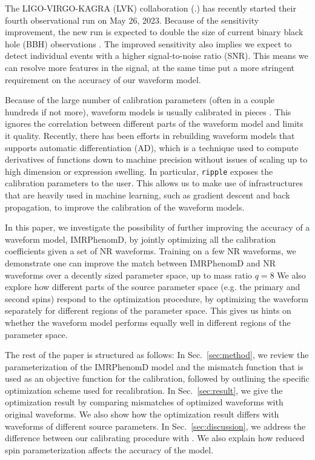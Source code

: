 \documentclass[twocolumn]{aastex631}
\newcommand{\ripple}{\texttt{ripple}}
\begin{document}

The LIGO-VIRGO-KAGRA (LVK) collaboration
(\citep{LIGOScientific:2014pky,LIGOScientific:2021usb,LIGOScientific:2021djp,
VIRGO:2014yos,KAGRA:2020tym}.) has recently started their fourth observational
run on May 26, 2023. Because of the sensitivity improvement, the new run is
expected to double the size of current binary black hole (BBH) observations
\citep{abbott2020prospects}. The improved sensitivity also implies we expect to
detect individual events with a higher signal-to-noise ratio (SNR). This means
we can resolve more features in the signal, at the same time put a more
stringent requirement on the accuracy of our waveform model\citep{fill}.


Because of the large number of calibration parameters (often in a couple hundreds if not
more), waveform models is usually calibrated in pieces \citep{fill}. This
ignores the correlation between different parts of the waveform model and limits
it quality. Recently, there has been efforts in rebuilding waveform models
\citep{fill} that supports automatic differentiation (AD)\citep{fill}, which is
a technique used to compute derivatives of functions down to machine precision
without issues of scaling up to high dimension or expression swelling. In
particular, {\ripple} \citep{ripple} exposes the calibration parameters to the
user. This allows us to make use of infrastructures that are heavily used in
machine learning, such as gradient descent and back propagation\cite{fill}, to
improve the calibration of the waveform models.

In this paper, we investigate the possibility of further improving the accuracy
of a waveform model, IMRPhenomD\citep{fill}, by jointly optimizing all the
calibration coefficients given a set of NR waveforms. Training on a few NR
waveforms, we demonstrate one can improve the match between IMRPhenomD and NR
waveforms over a decently sized parameter space, up to mass ratio $q=8$ We also
explore how different parts of the source parameter space (e.g. the primary and
second spins) respond to the optimization procedure, by optimizing the waveform
separately for different regions of the parameter space. This gives us hints on
whether the waveform model performs equally well in different regions of the
parameter space.

The rest of the paper is structured as follows: In Sec.~\ref{sec:method}, we
review the parameterization of the IMRPhenomD model and the mismatch function
that is used as an objective function for the calibration, followed by outlining the
specific optimization scheme used for recalibration. In
Sec.~\ref{sec:result}, we give the optimization result by comparing mismatches
of optimized waveforms with original waveforms. We also show how the
optimization result differs with waveforms of different source parameters. In
Sec.~\ref{sec:discussion}, we address the difference between our calibrating
procedure with \citep{khan2016frequency}. We also explain how reduced spin
parameterization affects the accuracy of the model. 
\end{document}
